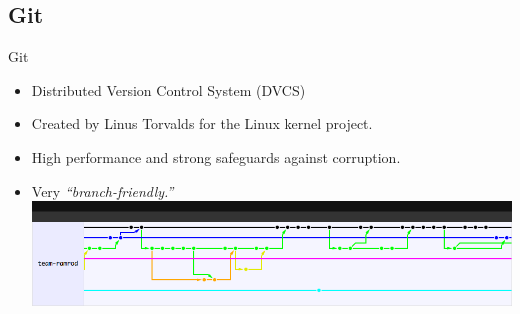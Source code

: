 \documentclass[xcolor=dvipsnames]{beamer}
\begin{document}
    \subsection{Git}
      \begin{frame}{Git}
        \Large
        \begin{itemize}
          \pause \item Distributed Version Control System (DVCS)
          \pause \item Created by Linus Torvalds for the Linux kernel project.
          \pause \item High performance and strong safeguards against corruption.
          \pause \item Very \emph{``branch-friendly.''}
                       \includegraphics[width=\linewidth]{images/branching}
        \end{itemize}

      \end{frame}
\end{document}
